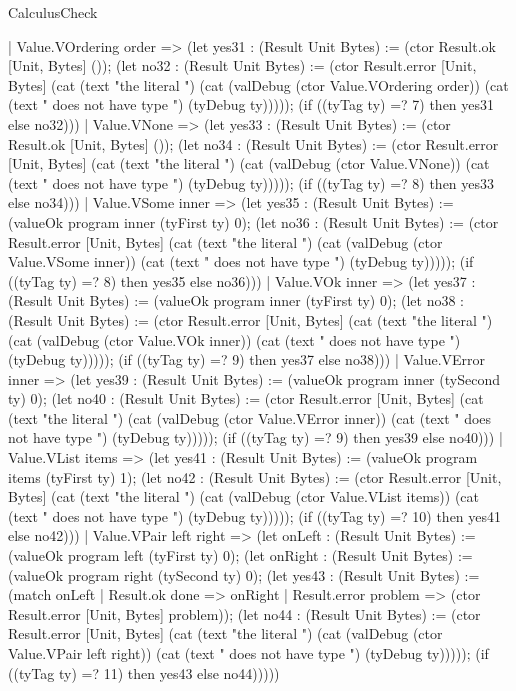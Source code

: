 \begin{lexlean}{CalculusCheck}
\begin{semanticmodule}
{    | Value.VOrdering order => (let yes31 : (Result Unit Bytes) := (ctor Result.ok [Unit, Bytes] ()); (let no32 : (Result Unit Bytes) := (ctor Result.error [Unit, Bytes] (cat (text "the literal ") (cat (valDebug (ctor Value.VOrdering order)) (cat (text " does not have type ") (tyDebug ty))))); (if ((tyTag ty) =? 7) then yes31 else no32)))
    | Value.VNone => (let yes33 : (Result Unit Bytes) := (ctor Result.ok [Unit, Bytes] ()); (let no34 : (Result Unit Bytes) := (ctor Result.error [Unit, Bytes] (cat (text "the literal ") (cat (valDebug (ctor Value.VNone)) (cat (text " does not have type ") (tyDebug ty))))); (if ((tyTag ty) =? 8) then yes33 else no34)))
    | Value.VSome inner => (let yes35 : (Result Unit Bytes) := (valueOk program inner (tyFirst ty) 0); (let no36 : (Result Unit Bytes) := (ctor Result.error [Unit, Bytes] (cat (text "the literal ") (cat (valDebug (ctor Value.VSome inner)) (cat (text " does not have type ") (tyDebug ty))))); (if ((tyTag ty) =? 8) then yes35 else no36)))
    | Value.VOk inner => (let yes37 : (Result Unit Bytes) := (valueOk program inner (tyFirst ty) 0); (let no38 : (Result Unit Bytes) := (ctor Result.error [Unit, Bytes] (cat (text "the literal ") (cat (valDebug (ctor Value.VOk inner)) (cat (text " does not have type ") (tyDebug ty))))); (if ((tyTag ty) =? 9) then yes37 else no38)))
    | Value.VError inner => (let yes39 : (Result Unit Bytes) := (valueOk program inner (tySecond ty) 0); (let no40 : (Result Unit Bytes) := (ctor Result.error [Unit, Bytes] (cat (text "the literal ") (cat (valDebug (ctor Value.VError inner)) (cat (text " does not have type ") (tyDebug ty))))); (if ((tyTag ty) =? 9) then yes39 else no40)))
    | Value.VList items => (let yes41 : (Result Unit Bytes) := (valueOk program items (tyFirst ty) 1); (let no42 : (Result Unit Bytes) := (ctor Result.error [Unit, Bytes] (cat (text "the literal ") (cat (valDebug (ctor Value.VList items)) (cat (text " does not have type ") (tyDebug ty))))); (if ((tyTag ty) =? 10) then yes41 else no42)))
    | Value.VPair left right => (let onLeft : (Result Unit Bytes) := (valueOk program left (tyFirst ty) 0); (let onRight : (Result Unit Bytes) := (valueOk program right (tySecond ty) 0); (let yes43 : (Result Unit Bytes) := (match onLeft
      | Result.ok done => onRight
      | Result.error problem => (ctor Result.error [Unit, Bytes] problem)); (let no44 : (Result Unit Bytes) := (ctor Result.error [Unit, Bytes] (cat (text "the literal ") (cat (valDebug (ctor Value.VPair left right)) (cat (text " does not have type ") (tyDebug ty))))); (if ((tyTag ty) =? 11) then yes43 else no44)))))
}
\end{semanticmodule}
\end{lexlean}
